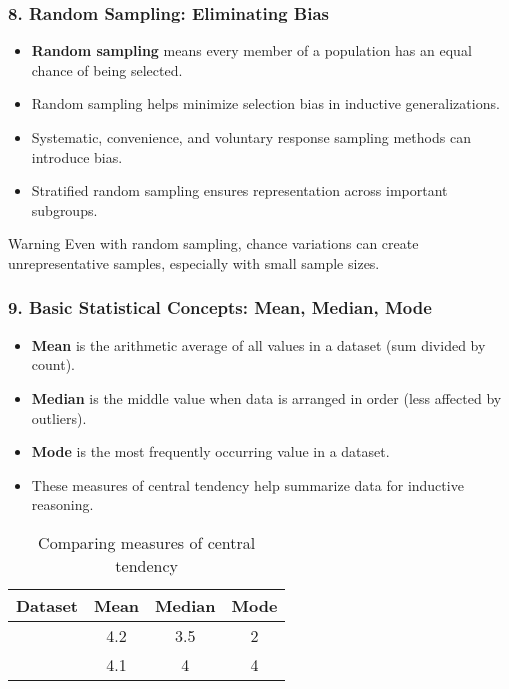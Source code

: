 \documentclass{beamer}
\begin{document}
\begin{frame}
\frametitle{8. Random Sampling: Eliminating Bias}
\begin{itemize}
\item \textbf{Random sampling} means every member of a population has an equal chance of being selected.
\item Random sampling helps minimize selection bias in inductive generalizations.
\item Systematic, convenience, and voluntary response sampling methods can introduce bias.
\item Stratified random sampling ensures representation across important subgroups.
\end{itemize}

\begin{alertblock}{Warning}
Even with random sampling, chance variations can create unrepresentative samples, especially with small sample sizes.
\end{alertblock}
\end{frame}

\begin{frame}
\frametitle{9. Basic Statistical Concepts: Mean, Median, Mode}
\begin{itemize}
\item \textbf{Mean} is the arithmetic average of all values in a dataset (sum divided by count).
\item \textbf{Median} is the middle value when data is arranged in order (less affected by outliers).
\item \textbf{Mode} is the most frequently occurring value in a dataset.
\item These measures of central tendency help summarize data for inductive reasoning.
\end{itemize}

\begin{table}
\centering
\begin{tabular}{|l|c|c|c|}
\hline
\textbf{Dataset} & \textbf{Mean} & \textbf{Median} & \textbf{Mode} \\
\hline
[2,2,3,4,5,9] & 4.2 & 3.5 & 2 \\
\hline
[3,3,4,4,4,5,6] & 4.1 & 4 & 4 \\
\hline
\end{tabular}
\caption{Comparing measures of central tendency}
\end{table}
\end{frame}
\end{document}
